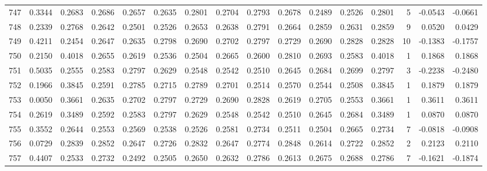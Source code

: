 \begin{tabular}{lrrrrrrrrrrrrrrr}
747 &      0.3344 &  0.2683 &  0.2686 &  0.2657 &  0.2635 &  0.2801 &  0.2704 &  0.2793 &  0.2678 &  0.2489 &   0.2526 &     0.2801 &      5 &                   -0.0543 &                    -0.0661 \\
748 &      0.2339 &  0.2768 &  0.2642 &  0.2501 &  0.2526 &  0.2653 &  0.2638 &  0.2791 &  0.2664 &  0.2859 &   0.2631 &     0.2859 &      9 &                    0.0520 &                     0.0429 \\
749 &      0.4211 &  0.2454 &  0.2647 &  0.2635 &  0.2798 &  0.2690 &  0.2702 &  0.2797 &  0.2729 &  0.2690 &   0.2828 &     0.2828 &     10 &                   -0.1383 &                    -0.1757 \\
750 &      0.2150 &  0.4018 &  0.2655 &  0.2619 &  0.2536 &  0.2504 &  0.2665 &  0.2600 &  0.2810 &  0.2693 &   0.2583 &     0.4018 &      1 &                    0.1868 &                     0.1868 \\
751 &      0.5035 &  0.2555 &  0.2583 &  0.2797 &  0.2629 &  0.2548 &  0.2542 &  0.2510 &  0.2645 &  0.2684 &   0.2699 &     0.2797 &      3 &                   -0.2238 &                    -0.2480 \\
752 &      0.1966 &  0.3845 &  0.2591 &  0.2785 &  0.2715 &  0.2789 &  0.2701 &  0.2514 &  0.2570 &  0.2544 &   0.2508 &     0.3845 &      1 &                    0.1879 &                     0.1879 \\
753 &      0.0050 &  0.3661 &  0.2635 &  0.2702 &  0.2797 &  0.2729 &  0.2690 &  0.2828 &  0.2619 &  0.2705 &   0.2553 &     0.3661 &      1 &                    0.3611 &                     0.3611 \\
754 &      0.2619 &  0.3489 &  0.2592 &  0.2583 &  0.2797 &  0.2629 &  0.2548 &  0.2542 &  0.2510 &  0.2645 &   0.2684 &     0.3489 &      1 &                    0.0870 &                     0.0870 \\
755 &      0.3552 &  0.2644 &  0.2553 &  0.2569 &  0.2538 &  0.2526 &  0.2581 &  0.2734 &  0.2511 &  0.2504 &   0.2665 &     0.2734 &      7 &                   -0.0818 &                    -0.0908 \\
756 &      0.0729 &  0.2839 &  0.2852 &  0.2647 &  0.2726 &  0.2832 &  0.2647 &  0.2774 &  0.2848 &  0.2614 &   0.2722 &     0.2852 &      2 &                    0.2123 &                     0.2110 \\
757 &      0.4407 &  0.2533 &  0.2732 &  0.2492 &  0.2505 &  0.2650 &  0.2632 &  0.2786 &  0.2613 &  0.2675 &   0.2688 &     0.2786 &      7 &                   -0.1621 &                    -0.1874 \\

\end{tabular}
